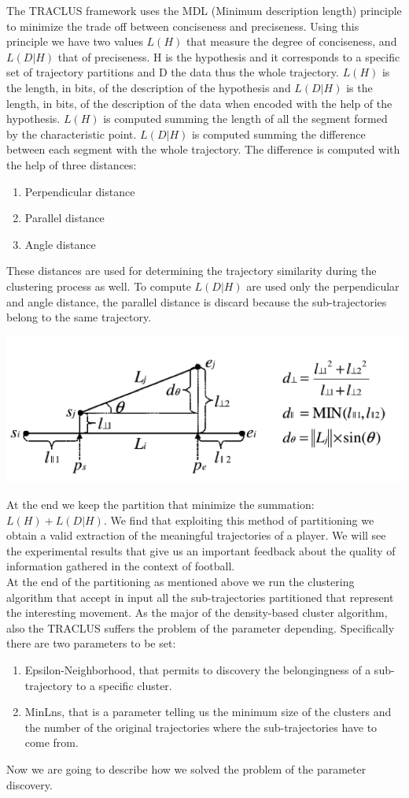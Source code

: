 \documentclass{acm_proc_article-sp-sigmod07}
\begin{document}
The TRACLUS framework uses the MDL (Minimum description length) principle to minimize the trade off between conciseness and preciseness. Using this principle we have two values $L(H)$ that measure the degree of conciseness, and $L(D|H)$ that of preciseness. H is the hypothesis and it corresponds to a specific set of trajectory partitions and D the data thus the whole trajectory. 
$L(H)$ is the length, in bits, of the description of the hypothesis and $L(D|H)$ is the length, in bits, of the description of the data when encoded with the help of the hypothesis. $L(H)$ is computed summing the length of all the segment formed by the characteristic point. $L(D|H)$ is computed summing the difference between each segment with the whole trajectory.
The difference is computed with the help of three distances:
\begin{enumerate}
  \item Perpendicular distance
  \item Parallel distance
  \item Angle distance
\end{enumerate}
These distances are used for determining the trajectory similarity during the clustering process as well.
To compute $L(D|H)$ are used only the perpendicular and angle distance, the parallel distance is discard because the sub-trajectories belong to the same trajectory. 


\includegraphics[scale=0.8]{traclus2}

At the end we keep the partition that minimize the summation: $L(H) + L(D|H)$.
We find that exploiting this method of partitioning we obtain a valid extraction of the meaningful trajectories of a player. We will see the experimental results that give us an important feedback about the quality of information gathered in the context of football.  \\
At the end of the partitioning as mentioned above we run the clustering algorithm that accept in input all the sub-trajectories partitioned that represent the interesting movement. 
As the major of the density-based cluster algorithm, also the TRACLUS suffers the problem of the parameter depending. Specifically there are two parameters to be set:
\begin{enumerate}
  \item Epsilon-Neighborhood, that permits to discovery the belongingness of a sub-trajectory to a specific cluster.
  \item MinLns, that is a parameter telling us the minimum size of the clusters and the number of the original trajectories where the sub-trajectories have to come from.
\end{enumerate}
Now we are going to describe how we solved the problem of the parameter discovery.
 
\end{document}
